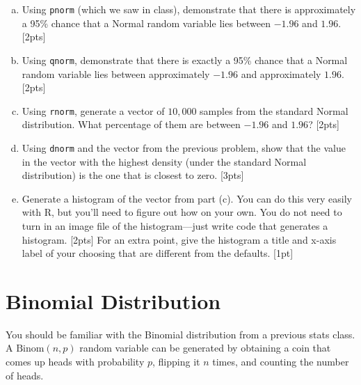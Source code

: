 \documentclass[12pt]{article}
\newcommand{\Binom}{\text{Binom}}
\begin{document}
	\begin{enumerate}[(a)]
		\item Using \verb|pnorm| (which we saw in class), demonstrate that there is approximately a 95\% chance that a Normal random variable lies between $-1.96$ and $1.96$. [2pts]
		\item Using \verb|qnorm|, demonstrate that there is exactly a 95\% chance that a Normal random variable lies between approximately $-1.96$ and approximately $1.96$. [2pts]
		\item Using \verb|rnorm|, generate a vector of $10,000$ samples from the standard Normal distribution. What percentage of them are between $-1.96$ and $1.96$? [2pts]
		\item Using \verb|dnorm| and the vector from the previous problem, show that the value in the vector with the highest density (under the standard Normal distribution) is the one that is closest to zero. [3pts]
		\item Generate a histogram of the vector from part (c). You can do this very easily with R, but you'll need to figure out how on your own. You do not need to turn in an image file of the histogram---just write code that generates a histogram. [2pts] For an extra point, give the histogram a title and x-axis label of your choosing that are different from the defaults. [1pt]
	\end{enumerate}
	
	\section{Binomial Distribution}
	
	You should be familiar with the Binomial distribution from a previous stats class. A $\Binom(n,p)$ random variable can be generated by obtaining a coin that comes up heads with probability $p$, flipping it $n$ times, and counting the number of heads.
	
\end{document}
